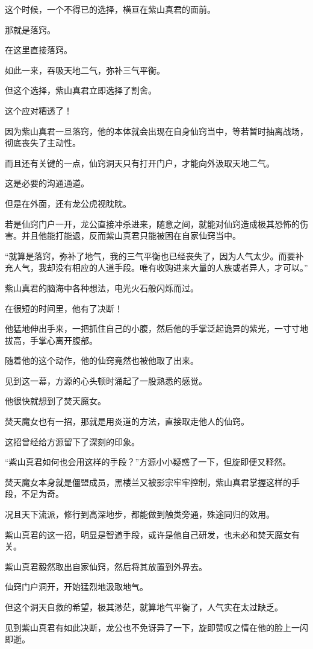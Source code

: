 \begin{this_body}
这个时候，一个不得已的选择，横亘在紫山真君的面前。

那就是落窍。

在这里直接落窍。

如此一来，吞吸天地二气，弥补三气平衡。

但这个选择，紫山真君立即选择了割舍。

这个应对糟透了！

因为紫山真君一旦落窍，他的本体就会出现在自身仙窍当中，等若暂时抽离战场，彻底丧失了主动性。

而且还有关键的一点，仙窍洞天只有打开门户，才能向外汲取天地二气。

这是必要的沟通通道。

但是在外面，还有龙公虎视眈眈。

若是仙窍门户一开，龙公直接冲杀进来，随意之间，就能对仙窍造成极其恐怖的伤害。并且他能打能退，反而紫山真君只能被困在自家仙窍当中。

“就算是落窍，弥补了地气，我的三气平衡也已经丧失了，因为人气太少。而要补充人气，我却没有相应的人道手段。唯有收购进来大量的人族或者异人，才可以。”

紫山真君的脑海中各种想法，电光火石般闪烁而过。

在很短的时间里，他有了决断！

他猛地伸出手来，一把抓住自己的小腹，然后他的手掌泛起诡异的紫光，一寸寸地拔高，手掌心离开腹部。

随着他的这个动作，他的仙窍竟然也被他取了出来。

见到这一幕，方源的心头顿时涌起了一股熟悉的感觉。

他很快就想到了焚天魔女。

焚天魔女也有一招，那就是用炎道的方法，直接取走他人的仙窍。

这招曾经给方源留下了深刻的印象。

“紫山真君如何也会用这样的手段？”方源小小疑惑了一下，但旋即便又释然。

焚天魔女本身就是僵盟成员，黑楼兰又被影宗牢牢控制，紫山真君掌握这样的手段，不足为奇。

况且天下流派，修行到高深地步，都能做到触类旁通，殊途同归的效用。

紫山真君的这一招，明显是智道手段，或许是他自己研发，也未必和焚天魔女有关。

紫山真君毅然取出自家仙窍，然后将其放置到外界去。

仙窍门户洞开，开始猛烈地汲取地气。

但这个洞天自救的希望，极其渺茫，就算地气平衡了，人气实在太过缺乏。

见到紫山真君有如此决断，龙公也不免讶异了一下，旋即赞叹之情在他的脸上一闪即逝。

\end{this_body}

